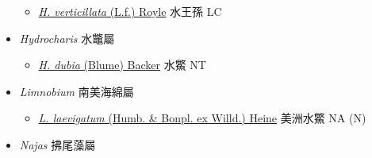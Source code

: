 \begin{itemize}
  \begin{itemize}
        \item[] \href{http://www.theplantlist.org/tpl1.1/search?q=Hydrilla+verticillata}{\textit{H. verticillata} (L.f.) Royle}   水王孫   LC
  \end{itemize}
 \item[] \textit{Hydrocharis} 水鼈屬
                                
  \begin{itemize}
        \item[] \href{http://www.theplantlist.org/tpl1.1/search?q=Hydrocharis+dubia}{\textit{H. dubia} (Blume) Backer}   水鱉   NT
  \end{itemize}
 \item[] \textit{Limnobium} 南美海綿屬
                                
  \begin{itemize}
        \item[] \href{http://www.theplantlist.org/tpl1.1/search?q=Limnobium+laevigatum}{\textit{L. laevigatum} (Humb. \& Bonpl. ex Willd.) Heine}   美洲水鱉   NA (N)
  \end{itemize}
 \item[] \textit{Najas} 拂尾藻屬
                                

\end{itemize}
